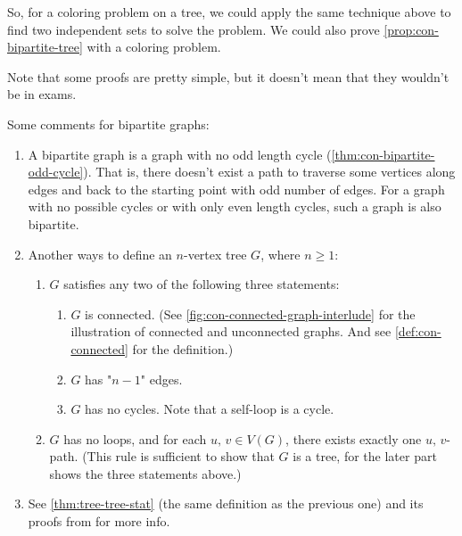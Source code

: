\documentclass[../src/handouts/main.tex]{subfiles}
\begin{document}
So, for a coloring problem on a tree, we could apply the same technique above to find two independent sets to solve the problem. We could also prove \cref{prop:con-bipartite-tree} with a coloring problem. %

Note that some proofs are pretty simple, but it doesn't mean that they wouldn't be in exams.

Some comments for bipartite graphs:
\begin{enumerate}
  \item \label{enum:con-bipartite-odd} A bipartite graph is a graph with no odd length cycle (\cref{thm:con-bipartite-odd-cycle}). That is, there doesn't exist a path to traverse some vertices along edges and back to the starting point with odd number of edges. For a graph with no possible cycles or with only even length cycles, such a graph is also bipartite. 

  \item \label{enum:con-tree-state} Another ways to define an $n$-vertex tree $G$, where $n \geq 1$:
    \begin{enumerate}
      \item $G$ satisfies any two of the following three statements:
        \begin{enumerate}
          \item $G$ is connected. (See \cref{fig:con-connected-graph-interlude} for the illustration of connected and unconnected graphs. And see \cref{def:con-connected} for the definition.)
          \item $G$ has "$n - 1$" edges.
          \item $G$ has no cycles. Note that a self-loop is a cycle.
        \end{enumerate}
      \item $G$ has no loops, and for each $u,\, v \in V(G)$, there exists exactly one $u,\, v$-path. (This rule is sufficient to show that $G$ is a tree, for the later part shows the three statements above.)
    \end{enumerate}

  \item See \cref{thm:tree-tree-stat} (the same definition as the previous one) and its proofs from  for more info.
\end{enumerate}
\end{document}
